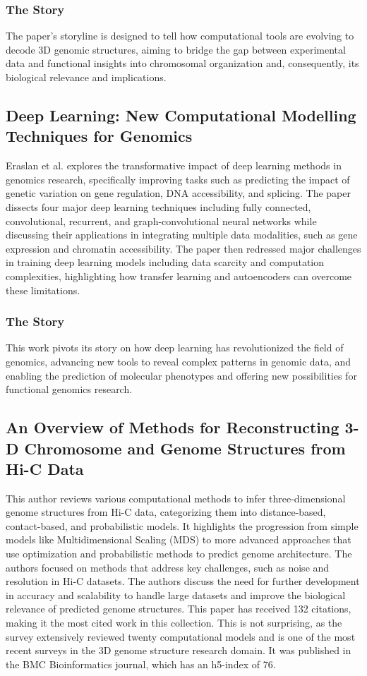\subsubsection{The Story}
The paper's storyline is designed to tell how computational tools are evolving to decode 3D genomic structures, aiming to bridge the gap between experimental data and functional insights into chromosomal organization and, consequently, its biological relevance and implications.


\subsection{Deep Learning: New Computational Modelling Techniques for Genomics}
Eraslan et al. \cite{eraslan_deep_2019} explores the transformative impact of deep learning methods in genomics research, specifically improving tasks such as predicting the impact of genetic variation on gene regulation, DNA accessibility, and splicing. The paper dissects four major deep learning techniques including fully connected, convolutional, recurrent, and graph-convolutional neural networks while discussing their applications in integrating multiple data modalities, such as gene expression and chromatin accessibility. The paper then redressed major challenges in training deep learning models including data scarcity and computation complexities, highlighting how transfer learning and autoencoders can overcome these limitations.
\subsubsection{The Story}
This work pivots its story on how deep learning has revolutionized the field of genomics, advancing new tools to reveal complex patterns in genomic data, and enabling the prediction of molecular phenotypes and offering new possibilities for functional genomics research.

\subsection{An Overview of Methods for Reconstructing 3-D Chromosome and Genome Structures from Hi-C Data}
This author \cite{oluwadare_overview_2019} reviews various computational methods to infer three-dimensional genome structures from Hi-C data, categorizing them into distance-based, contact-based, and probabilistic models.
It highlights the progression from simple models like Multidimensional Scaling (MDS) to more advanced approaches that use optimization and probabilistic methods to predict genome architecture. The authors focused on methods that address key challenges, such as noise and resolution in Hi-C datasets. 
The authors discuss the need for further development in accuracy and scalability to handle large datasets and improve the biological relevance of predicted genome structures. This paper has received 132 citations, making it the most cited work in this collection. This is not surprising, as the survey extensively reviewed twenty computational models and is one of the most recent surveys in the 3D genome structure research domain. It was published in the BMC Bioinformatics journal, which has an h5-index of 76.
